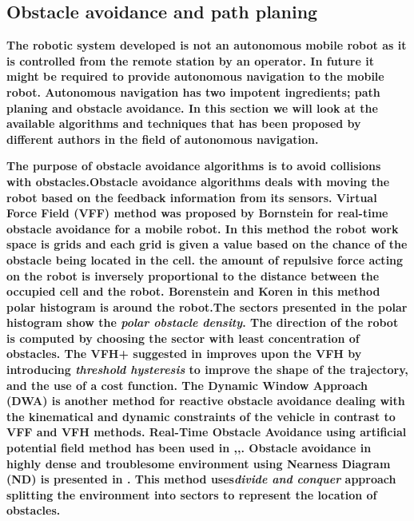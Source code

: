 \subsection{Obstacle avoidance and path planing}

\textbf{The robotic system developed is not an autonomous mobile robot as it is controlled from the remote station by an operator. In future it might be required to provide autonomous navigation to the mobile robot. Autonomous navigation has two impotent ingredients; path planing and obstacle avoidance. In this section we will look at the available algorithms and techniques that has been proposed by different authors in the field of autonomous navigation. } 

\textbf{The purpose of obstacle avoidance algorithms is to avoid collisions with obstacles.Obstacle avoidance algorithms deals with moving the robot based on the feedback
information from its sensors. Virtual Force Field (VFF) method was proposed by Bornstein \cite{borenstein1989real} for  real-time obstacle avoidance for a mobile robot. In this method the robot work space is grids and each grid is given a value based on the chance of  the obstacle being  located in the cell. the amount of repulsive force acting on the robot is inversely proportional to the distance between the occupied cell and the robot. Borenstein and Koren \cite{borenstein1991vector} in this method polar histogram is around the robot.The sectors presented in the polar histogram show the \textit{polar obstacle density}. The direction of the robot is computed by choosing the sector with least concentration of obstacles. The VFH+ suggested in \cite{ulrich1998vfh+} improves upon the VFH  by introducing  \textit{threshold hysteresis} to improve the shape of the trajectory, and the use of a cost function. The Dynamic Window Approach (DWA) \cite{brock1999high} is another method for reactive obstacle avoidance dealing with the kinematical and dynamic constraints of the vehicle in contrast to VFF and VFH methods. Real-Time Obstacle Avoidance  using artificial potential field method has been used in \cite{khatib1986real},\cite{tang2010novel},\cite{park2001obstacle}. Obstacle avoidance in highly dense and troublesome environment using Nearness Diagram (ND) is presented in \cite{minguez2004nearness}. This method uses\textit{divide and conquer} approach splitting the environment into sectors to represent the location of obstacles. }

